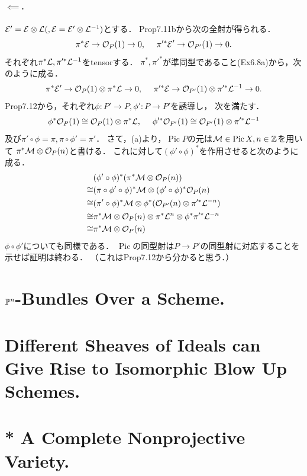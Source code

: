 \documentclass[a4paper]{jsarticle}
\newcommand{\Pic}{\operatorname{Pic}}
\begin{document}
    \paragraph{$\impliedby$.}
    $\mathcal{E}'=\mathcal{E} \otimes \mathcal{L} (, \mathcal{E}=\mathcal{E}' \otimes \mathcal{L}^{-1})$とする．
    Prop7.11bから次の全射が得られる．
    \[
        \pi^* \mathcal{E} \to \mathcal{O}_{P}(1) \to 0
        ,~~~~
        \pi'^* \mathcal{E}' \to \mathcal{O}_{P'}(1) \to 0.
    \]
    それぞれ$\pi^* \mathcal{L}, \pi'^* \mathcal{L}^{-1}$をtensorする．
    $\pi^*, \pi'^*$が準同型であること(Ex6.8a)から，次のように成る．
    \[
        \pi^* \mathcal{E}' \to \mathcal{O}_{P}(1) \otimes \pi^* \mathcal{L} \to 0
        ,~~~~
        \pi'^* \mathcal{E} \to \mathcal{O}_{P'}(1) \otimes \pi'^* \mathcal{L}^{-1} \to 0.
    \]
    Prop7.12から，それぞれ$\phi: P' \to P, \phi': P \to P'$を誘導し，
    次を満たす．
    \[
        \phi^* \mathcal{O}_{P}(1) \cong \mathcal{O}_{P}(1) \otimes \pi^* \mathcal{L}
        ,~~~~
        \phi'^* \mathcal{O}_{P'}(1) \cong \mathcal{O}_{P'}(1) \otimes \pi'^* \mathcal{L}^{-1}
    \]
    及び$\pi' \circ \phi=\pi, \pi \circ \phi'=\pi'$．
    さて，(a)より，$\Pic P$の元は$\shM \in \Pic X, n \in \Z$を用いて
    $\pi^* \mathcal{M} \otimes \mathcal{O}_P(n)$と書ける．
    これに対して$(\phi' \circ \phi)^*$を作用させると次のように成る．
    \begin{align*}
        {}&     (\phi' \circ \phi)^*(\pi^* \mathcal{M} \otimes \mathcal{O}_P(n)) \\
        \cong&   (\pi \circ \phi' \circ \phi)^*\mathcal{M} \otimes (\phi' \circ \phi)^*\mathcal{O}_P(n) \\
        \cong&   (\pi' \circ \phi)^*\mathcal{M} \otimes \phi^*(\mathcal{O}_{P'}(n) \otimes \pi'^* \mathcal{L}^{-n}) \\
        \cong&   \pi^*\mathcal{M} \otimes \mathcal{O}_{P}(n) \otimes \pi^* \mathcal{L}^{n} \otimes \phi^*\pi'^* \mathcal{L}^{-n} \\
        \cong&   \pi^*\mathcal{M} \otimes \mathcal{O}_{P}(n)
    \end{align*}
    $\phi \circ \phi'$についても同様である．
    $\Pic$の同型射は$P \to P'$の同型射に対応することを示せば証明は終わる．
    （これはProp7.12から分かると思う．）

\section{$\mathbb{P}^n$-Bundles Over a Scheme.} %

\section{Different Sheaves of Ideals can Give Rise to Isomorphic Blow Up Schemes.} %

\section{ } %

\section{* A Complete Nonprojective Variety.} %

\section{ } %
\end{document}
